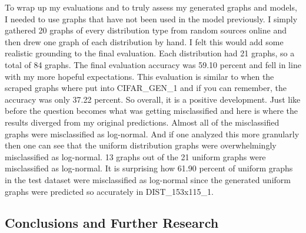 \documentclass[12pt]{article}
\begin{document}
            To wrap up my evaluations and to truly assess my generated graphs and models, 
            I needed to use graphs that have not been used in the model previously. 
            I simply gathered 20 graphs of every distribution type from random sources online 
            and then drew one graph of each distribution by hand. I felt this would add some realistic grounding to the final evaluation. 
            Each distribution had 21 graphs, so a total of 84 graphs. 
            The final evaluation accuracy was 59.10 percent and fell in line with my more hopeful expectations. 
            This evaluation is similar to when the scraped graphs where put into CIFAR\_GEN\_1 and if you can remember, 
            the accuracy was only 37.22 percent. So overall, it is a positive development. 
            Just like before the question becomes what was getting misclassified 
            and here is where the results diverged from my original predictions. 
            Almost all of the misclassified graphs were misclassified as log-normal. 
            And if one analyzed this more granularly then one can see 
            that the uniform distribution graphs were overwhelmingly misclassified as log-normal. 
            13 graphs out of the 21 uniform graphs were misclassified as log-normal. 
            It is surprising how 61.90 percent of uniform graphs in the test dataset were misclassified as log-normal 
            since the generated uniform graphs were predicted so accurately in DIST\_153x115\_1.
            
        
        \newpage \subsection{Conclusions and Further Research}
\end{document}
